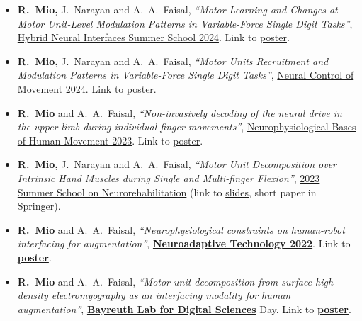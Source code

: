 \documentclass[a4paper,10pt]{article}
\begin{document}
\begin{itemize}
  \item \textbf{R.\ Mio,} J.\ Narayan and A.\ A.\ Faisal,
        \textit{``Motor Learning and Changes at Motor Unit-Level Modulation Patterns in
        Variable-Force Single Digit Tasks''},
        \href{https://www.hybridneuro.feri.um.si/summerschools/summer_school_mb.html}{Hybrid Neural
        Interfaces Summer School 2024}.
        Link to \href{https://drive.google.com/file/d/1yv2fcYvdUpcuaJlFeGLkEX01z2izDLAD/view}{poster}.

  \item \textbf{R.\ Mio,} J.\ Narayan and A.\ A.\ Faisal,
        \textit{``Motor Units Recruitment and Modulation Patterns in Variable-Force Single Digit
        Tasks''},
        \href{https://ncm-society.org/}{Neural Control of Movement 2024}.
        Link to \href{https://drive.google.com/file/d/17kBlPfE_kr3WV9e0rjOBWC9FSO4G9oKw/view}{poster}.

  \item \textbf{R.\ Mio} and A.\ A.\ Faisal,
        \textit{``Non-invasively decoding of the neural drive in the upper-limb during individual
        finger movements''},
        \href{https://www.physoc.org/events/neurophysiological-bases-of-human-movement/}{Neurophysiological
        Bases of Human Movement 2023}.
        Link to \href{https://drive.google.com/file/d/1-DpTwF4H6sdqBJrMI3x_ZBgHl-5VQmVk/view}{poster}.

  \item \textbf{R.\ Mio,} J.\ Narayan and A.\ A.\ Faisal,
        \textit{``Motor Unit Decomposition over Intrinsic Hand Muscles during Single and
        Multi-finger Flexion''},
        \href{https://2023.summerschoolneurorehabilitation.org}{2023 Summer School on
        Neurorehabilitation}
        (link to \href{https://drive.google.com/file/d/1-HyJaLUFHGsnG2T6gvZWTOqyVgjK2bR5/view}{slides},
        short paper in Springer).

  \item \textbf{R.\ Mio} and A.\ A.\ Faisal,
        \textit{``Neurophysiological constraints on human-robot interfacing for augmentation''},
        \href{https://neuroadaptive.org/conference/2022/}{\textbf{Neuroadaptive Technology 2022}}.
        Link to \href{https://drive.google.com/file/d/1CpjFdZZpJDgakxyRok4HfbizW350qU1z/view}{\textbf{poster}}.

  \item \textbf{R.\ Mio} and A.\ A.\ Faisal,
        \textit{``Motor unit decomposition from surface high-density electromyography as an
        interfacing modality for human augmentation''},
        \href{https://www.baylds.uni-bayreuth.de/de/index.html}{\textbf{Bayreuth Lab for Digital
        Sciences}} Day.
        Link to \href{https://drive.google.com/file/d/1CoQB-ViriyMpCrMtY-vz5LEwlsmC-0Zd/view}{\textbf{poster}}.


\end{itemize}
\end{document}
